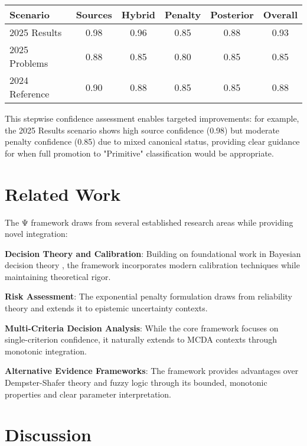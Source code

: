\documentclass[12pt,a4paper]{article}
\begin{document}
\begin{center}
\begin{tabular}{@{}lccccc@{}}
\toprule
Scenario & Sources & Hybrid & Penalty & Posterior & Overall \\
\midrule
2025 Results & 0.98 & 0.96 & 0.85 & 0.88 & 0.93 \\
2025 Problems & 0.88 & 0.85 & 0.80 & 0.85 & 0.85 \\
2024 Reference & 0.90 & 0.88 & 0.85 & 0.85 & 0.88 \\
\bottomrule
\end{tabular}
\end{center}

This stepwise confidence assessment enables targeted improvements: for example, the 2025 Results scenario shows high source confidence (0.98) but moderate penalty confidence (0.85) due to mixed canonical status, providing clear guidance for when full promotion to "Primitive" classification would be appropriate.

\section{Related Work}

The Ψ framework draws from several established research areas while providing novel integration:

\textbf{Decision Theory and Calibration}: Building on foundational work in Bayesian decision theory \citep{Berger1985, Savage1954}, the framework incorporates modern calibration techniques \citep{GneitingRaftery2007, Guo2017} while maintaining theoretical rigor.

\textbf{Risk Assessment}: The exponential penalty formulation draws from reliability theory \citep{Cox1972, BarlowProschan1981} and extends it to epistemic uncertainty contexts.

\textbf{Multi-Criteria Decision Analysis}: While the core framework focuses on single-criterion confidence, it naturally extends to MCDA contexts \citep{KeeneyRaiffa1993, Saaty1980} through monotonic integration.

\textbf{Alternative Evidence Frameworks}: The framework provides advantages over Dempster-Shafer theory \citep{Shafer1976} and fuzzy logic \citep{Zadeh1965} through its bounded, monotonic properties and clear parameter interpretation.

\section{Discussion}
\end{document}
